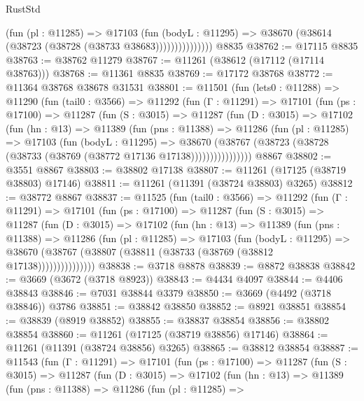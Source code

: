\begin{lexlean}{RustStd}
\begin{coremodule}
                      (fun (pl : @11285) =>
                      @17103
                        (fun (bodyL : @11295) =>
                        @38670 (@38614 (@38723 (@38728 (@38733 @38683)))))))))))))))
    @8835
@38762 := @17115 @8835
@38763 := @38762 @11279
@38767 := @11261 (@38612 (@17112 (@17114 @38763)))
@38768 := @11361 @8835
@38769 := @17172 @38768
@38772 := @11364 @38768 @38678 @31531
@38801 := @11501
    (fun (lets0 : @11288) =>
    @11290
      (fun (tail0 : @3566) =>
      @11292
        (fun (Γ : @11291) =>
        @17101
          (fun (ps : @17100) =>
          @11287
            (fun (S : @3015) =>
            @11287
              (fun (D : @3015) =>
              @17102
                (fun (hn : @13) =>
                @11389
                  (fun (pns : @11388) =>
                  @11286
                    (fun (pl : @11285) =>
                    @17103
                      (fun (bodyL : @11295) =>
                      @38670
                        (@38767
                          (@38723 (@38728 (@38733 (@38769 (@38772 @17136 @17138))))))))))))))))
    @8867
@38802 := @3551 @8867
@38803 := @38802 @17138
@38807 := @11261 (@17125 (@38719 @38803) @17146)
@38811 := @11261 (@11391 (@38724 @38803) @3265)
@38812 := @38772 @8867
@38837 := @11525
    (fun (tail0 : @3566) =>
    @11292
      (fun (Γ : @11291) =>
      @17101
        (fun (ps : @17100) =>
        @11287
          (fun (S : @3015) =>
          @11287
            (fun (D : @3015) =>
            @17102
              (fun (hn : @13) =>
              @11389
                (fun (pns : @11388) =>
                @11286
                  (fun (pl : @11285) =>
                  @17103
                    (fun (bodyL : @11295) =>
                    @38670 (@38767 (@38807 (@38811 (@38733 (@38769 (@38812 @17138)))))))))))))))
@38838 := @3718 @8878
@38839 := @8872 @38838
@38842 := @3669 (@3672 (@3718 @8923))
@38843 := @4434 @4097
@38844 := @4406 @38843
@38846 := @7031 @38844 @3379
@38850 := @3669 (@4492 (@3718 @38846)) @3786
@38851 := @38842 @38850
@38852 := @8921 @38851
@38854 := @38839 (@8919 @38852)
@38855 := @38837 @38854
@38856 := @38802 @38854
@38860 := @11261 (@17125 (@38719 @38856) @17146)
@38864 := @11261 (@11391 (@38724 @38856) @3265)
@38865 := @38812 @38854
@38887 := @11543
    (fun (Γ : @11291) =>
    @17101
      (fun (ps : @17100) =>
      @11287
        (fun (S : @3015) =>
        @11287
          (fun (D : @3015) =>
          @17102
            (fun (hn : @13) =>
            @11389
              (fun (pns : @11388) =>
              @11286
                (fun (pl : @11285) =>

\end{coremodule}
\end{lexlean}
